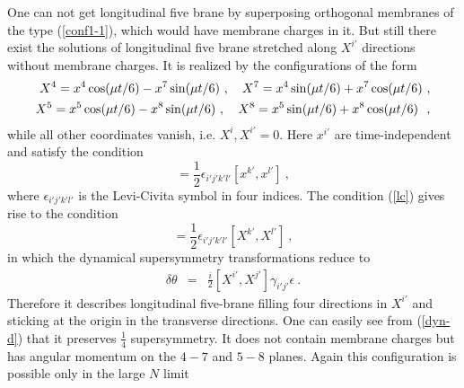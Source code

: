 \documentclass[a4paper,12pt]{article}
\begin{document}
One can not get longitudinal five brane by superposing orthogonal
membranes of the type (\ref{conf1-1}), which would have membrane
charges in it. But still there exist the solutions of longitudinal
five brane stretched along $X^{i'}$ directions without membrane
charges. It is realized by the configurations of the form
\begin{eqnarray}
X^{4}=x^4 \cos(\mu t/6) - x^7 \sin(\mu t/6) ~, \ \ \
X^{7}=x^4\sin(\mu t/6) + x^7 \cos(\mu t/6)~,\cr X^{5}=x^5 \cos(\mu
t/6) - x^8 \sin(\mu t/6) ~, \ \ \ X^{8}=x^5 \sin(\mu t/6) + x^8
\cos(\mu t/6)~~,
\label{conf2}
\end{eqnarray}
while all other coordinates vanish, i.e. $X^i, X^{i'}=0$. Here
$x^{i'}$ are time-independent and satisfy the condition
\begin{equation}
[x^{i'}, x^{j'} ] = \frac{1}{2}\epsilon_{i'j'k'l'}[x^{k'},
x^{l'}]~, \label{lc}
\end{equation}
where $\epsilon_{i'j'k'l'}$ is the Levi-Civita symbol in four
indices. The condition (\ref{lc}) gives rise to the condition
\begin{equation}
[X^{i'}, X^{j'} ] = \frac{1}{2}\epsilon_{i'j'k'l'}[X^{k'},
X^{l'}]~,
\end{equation}
in which the dynamical supersymmetry transformations reduce to
\begin{eqnarray}
\delta\theta &=& \frac{i}{2} [ X^{i'}, X^{j'}]
 \gamma_{i'j'}\epsilon~.
  \label{dyn-d}
\end{eqnarray}
Therefore it describes longitudinal five-brane filling four
directions in $X^{i'}$ and sticking at the origin in the
transverse directions. One can easily see from (\ref{dyn-d}) that
it preserves $\frac{1}{4}$ supersymmetry. It does not contain
membrane charges but has angular momentum on the $4-7$ and $5-8$
planes. Again this configuration is possible only in the large $N$
limit \cite{ban157}
\end{document}
